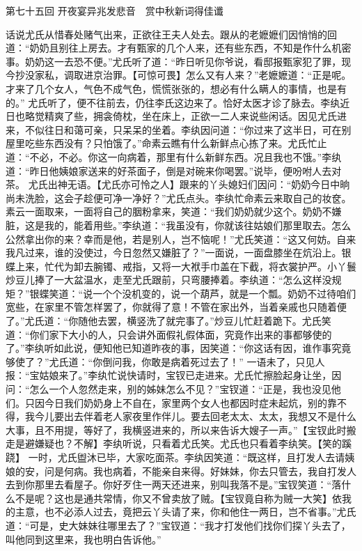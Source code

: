 \documentclass[12pt,oneside]{book}
\begin{document}
 
第七十五回  开夜宴异兆发悲音　赏中秋新词得佳谶


话说尤氏从惜春处赌气出来，正欲往王夫人处去。跟从的老嬷嬷们因悄悄的回道：“奶奶且别往上房去。才有甄家的几个人来，还有些东西，不知是作什么机密事。奶奶这一去恐不便。”尤氏听了道：“昨日听见你爷说，看邸报甄家犯了罪，现今抄没家私，调取进京治罪。【可惊可畏】怎么又有人来？”老嬷嬷道：“正是呢。才来了几个女人，气色不成气色，慌慌张张的，想必有什么瞒人的事情，也是有的。”
尤氏听了，便不往前去，仍往李氏这边来了。恰好太医才诊了脉去。李纨近日也略觉精爽了些，拥衾倚枕，坐在床上，正欲一二人来说些闲话。因见尤氏进来，不似往日和蔼可亲，只呆呆的坐着。李纨因问道：“你过来了这半日，可在别屋里吃些东西没有？只怕饿了。”命素云瞧有什么新鲜点心拣了来。尤氏忙止道：“不必，不必。你这一向病着，那里有什么新鲜东西。况且我也不饿。”李纨道：“昨日他姨娘家送来的好茶面子，倒是对碗来你喝罢。”说毕，便吩咐人去对茶。
尤氏出神无语。【尤氏亦可怜之人】跟来的丫头媳妇们因问：“奶奶今日中晌尚未洗脸，这会子趁便可净一净好？”尤氏点头。李纨忙命素云来取自己的妆奁。素云一面取来，一面将自己的胭粉拿来，笑道：“我们奶奶就少这个。奶奶不嫌脏，这是我的，能着用些。”李纨道：“我虽没有，你就该往姑娘们那里取去。怎么公然拿出你的来？幸而是他，若是别人，岂不恼呢！”尤氏笑道：“这又何妨。自来我凡过来，谁的没使过，今日忽然又嫌脏了？”一面说，一面盘膝坐在炕沿上。银蝶上来，忙代为卸去腕镯、戒指，又将一大袱手巾盖在下截，将衣裳护严。小丫鬟炒豆儿捧了一大盆温水，走至尤氏跟前，只弯腰捧着。李纨道：“怎么这样没规矩？”银蝶笑道：“说一个个没机变的，说一个葫芦，就是一个瓢。奶奶不过待咱们宽些，在家里不管怎样罢了，你就得了意！不管在家出外，当着亲戚也只随着便了。”尤氏道：“你随他去罢，横竖洗了就完事了。”炒豆儿忙赶着跪下。尤氏笑道：“你们家下大小的人，只会讲外面假礼假体面，究竟作出来的事都够使的了。”李纨听如此说，便知他已知道昨夜的事，因笑道：“你这话有因，谁作事究竟够使了？”尤氏道：“你倒问我，你敢是病着死过去了！”
一语未了，只见人报：“宝姑娘来了。”李纨忙说快请时，宝钗已走进来。尤氏忙擦脸起身让坐，因问：“怎么一个人忽然走来，别的姊妹怎么不见？”宝钗道：“正是，我也没见他们。只因今日我们奶奶身上不自在，家里两个女人也都因时症未起炕，别的靠不得，我今儿要出去伴着老人家夜里作伴儿。要去回老太太、太太，我想又不是什么大事，且不用提，等好了，我横竖进来的，所以来告诉大嫂子一声。”【宝钗此时搬走是避嫌疑也？不解】李纨听说，只看着尤氏笑。尤氏也只看着李纨笑。【笑的蹊跷】
一时，尤氏盥沐已毕，大家吃面茶。李纨因笑道：“既这样，且打发人去请姨娘的安，问是何病。我也病着，不能亲自来得。好妹妹，你去只管去，我自打发人去到你那里去看屋子。你好歹住一两天还进来，别叫我落不是。”宝钗笑道：“落什么不是呢？这也是通共常情，你又不曾卖放了贼。【宝钗竟自称为贼一大笑】依我的主意，也不必添人过去，竟把云丫头请了来，你和他住一两日，岂不省事。”尤氏道：“可是，史大妹妹往哪里去了？”宝钗道：“我才打发他们找你们探丫头去了，叫他同到这里来，我也明白告诉他。”
\end{document}
